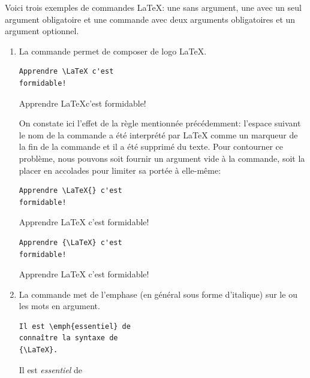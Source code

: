 \begin{exemple}
  \label{exemple:base:commandes}
  Voici trois exemples de commandes {\LaTeX}: une sans argument, une
  avec un seul argument obligatoire et une commande avec deux
  arguments obligatoires et un argument optionnel.
  \begin{enumerate}
  \item La commande \cmd{\LaTeX} permet de composer de logo {\LaTeX}.
    \begin{demo}
      \begin{texample}
\begin{lstlisting}
Apprendre \LaTeX c'est
formidable!
\end{lstlisting}
        \producing
        Apprendre \LaTeX c'est
        formidable!
      \end{texample}
    \end{demo}
    On constate ici l'effet de la règle mentionnée précédemment:
    l'espace suivant le nom de la commande a été interprété par
    {\LaTeX} comme un marqueur de la fin de la commande et il a été
    supprimé du texte. Pour contourner ce problème, nous pouvons soit
    fournir un argument vide à la commande, soit la placer en
    accolades pour limiter sa portée à elle-même:
    \begin{demo}
      \begin{texample}
\begin{lstlisting}
Apprendre \LaTeX{} c'est
formidable!
\end{lstlisting}
        \producing
        Apprendre \LaTeX{} c'est
        formidable!
      \end{texample}
      \begin{texample}
\begin{lstlisting}
Apprendre {\LaTeX} c'est
formidable!
\end{lstlisting}
        \producing
        Apprendre {\LaTeX} c'est
        formidable!
      \end{texample}
    \end{demo}
  \item La commande \cmd{\emph} met de l'emphase (en général sous
    forme d'italique) sur le ou les mots en argument.
    \begin{demo}
      \begin{texample}
\begin{lstlisting}
Il est \emph{essentiel} de
connaître la syntaxe de
{\LaTeX}.
\end{lstlisting}
        \producing
        Il est \emph{essentiel} de

\end{texample}
\end{demo}
\end{enumerate}
\end{exemple}
